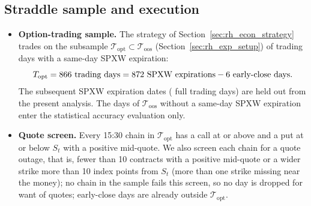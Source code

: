 \subsection{Straddle sample and execution}
\label{app:rh_econ_details}
\begin{itemize}
\item \textbf{Option-trading sample.} The strategy of Section~\ref{sec:rh_econ_strategy} trades on the subsample
  $\mathcal T_{\mathrm{opt}} \subset \mathcal T_{\mathrm{oos}}$ (Section~\ref{sec:rh_exp_setup}) of trading days with
  a same-day SPXW expiration:
  \[
    T_{\mathrm{opt}} = 866 \text{ trading days} = 872 \text{ SPXW expirations}
      - 6 \text{ early-close days}.
  \]
  The \rhdmHeldOutExpirations{} subsequent SPXW expiration dates (\rhdmHeldOut{} full trading days) are held out from
  the present analysis. The \rhoosNonOptDays{} days of $\mathcal T_{\mathrm{oos}}$ without a same-day SPXW expiration
  enter the statistical accuracy evaluation only.
\item \textbf{Quote screen.} Every 15:30 chain in $\mathcal T_{\mathrm{opt}}$ has a call at or above and a put at or
  below $S_t$ with a positive mid-quote. We also screen each chain for a quote outage, that is, fewer than 10
  contracts with a positive mid-quote or a wider strike more than 10 index points from $S_t$ (more than one strike
  missing near the money); no chain in the sample fails this screen, so no day is dropped for want of quotes;
  early-close days are already outside $\mathcal T_{\mathrm{opt}}$.

\end{itemize}
